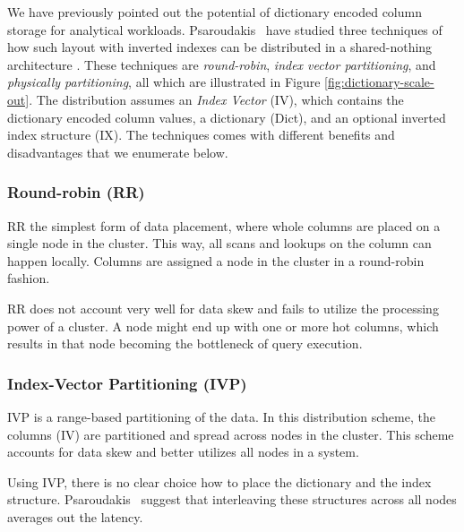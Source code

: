 
We have previously pointed out the potential of dictionary encoded column storage for analytical workloads. Psaroudakis \ea~have studied three techniques of how such layout with inverted indexes can be distributed in a shared-nothing architecture \cite{Psaroudakis2015-lc}. These techniques are \textit{round-robin}, \textit{index vector partitioning}, and \textit{physically partitioning}, all which are illustrated in Figure \ref{fig:dictionary-scale-out}. The distribution assumes an \textit{Index Vector} (IV), which contains the dictionary encoded column values, a dictionary (Dict), and an optional inverted index structure (IX). The techniques comes with different benefits and disadvantages that we enumerate below.

\subsubsection{Round-robin (RR)}
\label{ssub:Round-robin (RR)}
RR the simplest form of data placement, where whole columns are placed on a single node in the cluster. This way, all scans and lookups on the column can happen locally. Columns are assigned a node in the cluster in a round-robin fashion.

RR does not account very well for data skew and fails to utilize the processing power of a cluster. A node might end up with one or more hot columns, which results in that node becoming the bottleneck of query execution.

\subsubsection{Index-Vector Partitioning (IVP)}
\label{ssub:Index-Vector Partitioning (IVP)}
IVP is a range-based partitioning of the data. In this distribution scheme, the columns (IV) are partitioned and spread across nodes in the cluster. This scheme accounts for data skew and better utilizes all nodes in a system.

Using IVP, there is no clear choice how to place the dictionary and the index structure. Psaroudakis \ea~suggest that interleaving these structures across all nodes averages out the latency. 

